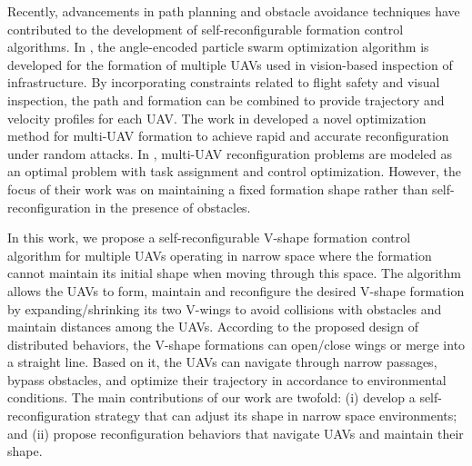 Recently, advancements in path planning and obstacle avoidance techniques have contributed to the development of self-reconfigurable formation control algorithms. In \cite{8843165}, the angle-encoded particle swarm optimization algorithm is developed for the formation of multiple UAVs used in vision-based inspection of infrastructure. By incorporating constraints related to flight safety and visual inspection, the path and formation can be combined to provide trajectory and velocity profiles for each UAV. The work in \cite{FENG2022} developed a novel optimization method for multi-UAV formation to achieve rapid and accurate reconfiguration under random attacks. In \cite{Gao2022}, multi-UAV reconfiguration problems are modeled as an optimal problem with task assignment and control optimization. However, the focus of their work was on maintaining a fixed formation shape rather than self-reconfiguration in the presence of obstacles.


In this work, we propose a self-reconfigurable V-shape formation control algorithm for multiple UAVs operating in narrow space where the formation cannot maintain its initial shape when moving through this space. The algorithm allows the UAVs to form, maintain and reconfigure the desired V-shape formation by expanding/shrinking its two V-wings to avoid collisions with obstacles and maintain distances among the UAVs. According to the proposed design of distributed behaviors, the V-shape formations can open/close wings or merge into a straight line. Based on it, the UAVs can navigate through narrow passages, bypass obstacles, and optimize their trajectory in accordance to environmental conditions. The main contributions of our work are twofold: (i) develop a self-reconfiguration strategy that can adjust its shape in narrow space environments; and (ii) propose reconfiguration behaviors that navigate UAVs and maintain their shape.

